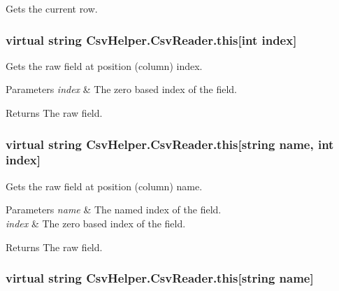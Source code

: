 Gets the current row. 

\hypertarget{a00057_a2ba794407171014c1c4a604cdb272a0b}{
\subsubsection[{this[int index]}]{\setlength{\rightskip}{0pt plus 5cm}virtual string Csv\-Helper.\-Csv\-Reader.\-this\mbox{[}int index\mbox{]}\hspace{0.3cm}{\ttfamily [get]}}}\label{a00057_a2ba794407171014c1c4a604cdb272a0b}


Gets the raw field at position (column) index. 


\begin{DoxyParams}{Parameters}
{\em index} & The zero based index of the field.\\
\hline
\end{DoxyParams}
\begin{DoxyReturn}{Returns}
The raw field.
\end{DoxyReturn}
\hypertarget{a00057_a1e72b5694536f70fd2df975c3fd5b827}{
\subsubsection[{this[string name, int index]}]{\setlength{\rightskip}{0pt plus 5cm}virtual string Csv\-Helper.\-Csv\-Reader.\-this\mbox{[}string name, int index\mbox{]}\hspace{0.3cm}{\ttfamily [get]}}}\label{a00057_a1e72b5694536f70fd2df975c3fd5b827}


Gets the raw field at position (column) name. 


\begin{DoxyParams}{Parameters}
{\em name} & The named index of the field.\\
\hline
{\em index} & The zero based index of the field.\\
\hline
\end{DoxyParams}
\begin{DoxyReturn}{Returns}
The raw field.
\end{DoxyReturn}
\hypertarget{a00057_a24af16e0522cb8b96775334783ea6939}{
\subsubsection[{this[string name]}]{\setlength{\rightskip}{0pt plus 5cm}virtual string Csv\-Helper.\-Csv\-Reader.\-this\mbox{[}string name\mbox{]}\hspace{0.3cm}{\ttfamily [get]}}}\label{a00057_a24af16e0522cb8b96775334783ea6939}



